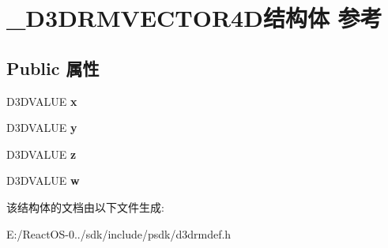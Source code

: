 \hypertarget{struct___d3_d_r_m_v_e_c_t_o_r4_d}{}\section{\+\_\+\+D3\+D\+R\+M\+V\+E\+C\+T\+O\+R4\+D结构体 参考}
\label{struct___d3_d_r_m_v_e_c_t_o_r4_d}
\subsection*{Public 属性}
\begin{DoxyCompactItemize}
\item 
\mbox{\label{struct___d3_d_r_m_v_e_c_t_o_r4_d_a009f3552d6b7eeb6992db880725e9f7d}} 
D3\+D\+V\+A\+L\+UE {\bfseries x}
\item 
\mbox{\label{struct___d3_d_r_m_v_e_c_t_o_r4_d_af85114933d7dfc77413cfd6e630e80c9}} 
D3\+D\+V\+A\+L\+UE {\bfseries y}
\item 
\mbox{\label{struct___d3_d_r_m_v_e_c_t_o_r4_d_af0a076fcd01ac50db5b29fe28edaa355}} 
D3\+D\+V\+A\+L\+UE {\bfseries z}
\item 
\mbox{\label{struct___d3_d_r_m_v_e_c_t_o_r4_d_a833d87f62cb1af53dbb4cbd8507d69b9}} 
D3\+D\+V\+A\+L\+UE {\bfseries w}
\end{DoxyCompactItemize}


该结构体的文档由以下文件生成\+:\begin{DoxyCompactItemize}
\item 
E\+:/\+React\+O\+S-\/0../sdk/include/psdk/d3drmdef.\+h\end{DoxyCompactItemize}
